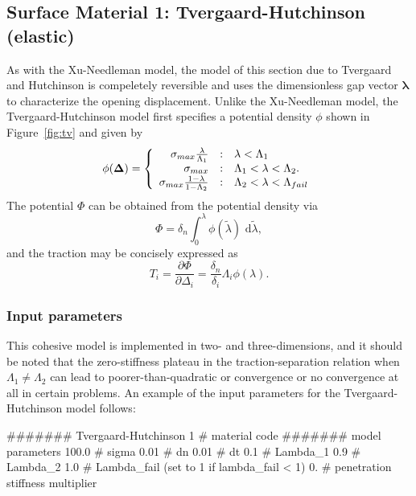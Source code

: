 \subsection{Surface Material 1: Tvergaard-Hutchinson (elastic)}
\label{sect.material.surface.tv}
As with the Xu-Needleman model, the model of this section due to Tvergaard
and Hutchinson \cite{Tvergaard1992} is compeletely reversible and uses
the dimensionless gap vector $\boldsymbol{\lambda}$ to characterize the
opening displacement. Unlike the Xu-Needleman model, the Tvergaard-Hutchinson
model first specifies a potential density $\phi$ shown in Figure~\ref{fig:tv} 
and given by
\begin{equation}
\phi(\mathbf{\Delta}) = \left\{
\begin{array}{r@{\quad:\quad}l} 
\sigma_{max} \frac{\lambda}{\Lambda_1} & \lambda < \Lambda_1 \\
	\sigma_{max} & \Lambda_1 < \lambda < \Lambda_2 .\\
     \sigma_{max} \frac{1-\lambda}{1-\Lambda_2} & \Lambda_2 < 
     \lambda < \Lambda_{fail}
\end{array}
\right.
\end{equation} 
The potential $\Phi$ can be obtained from the potential density via
\begin{equation}
\Phi = \delta_n \int_0^\lambda \phi(\tilde{\lambda}) \mbox{\ d}\tilde{\lambda},
\end{equation}
and the traction may be concisely expressed as
\begin{equation}
\label{eq.tvt}
T_i = \frac{\partial \Phi}{\partial \Delta_i} = \frac{\delta_n}{\delta_i} 
\Lambda_i \phi(\lambda).
\end{equation}

\subsubsection{Input parameters}
This cohesive model is implemented in two- and three-dimensions, and it should
be noted that the zero-stiffness plateau in the traction-separation relation
when $\Lambda_1 \neq \Lambda_2$ can lead to poorer-than-quadratic or 
convergence or no convergence at all in certain problems. 
An example of the input parameters for the Tvergaard-Hutchinson model 
follows: 
\begin{inputfile}
####### Tvergaard-Hutchinson
1     # material code
####### model parameters
100.0 # sigma 
0.01  # dn
0.01  # dt
0.1   # Lambda_1
0.9   # Lambda_2
1.0   # Lambda_fail (set to 1 if lambda_fail < 1)
0.    # penetration stiffness multiplier
\end{inputfile}

